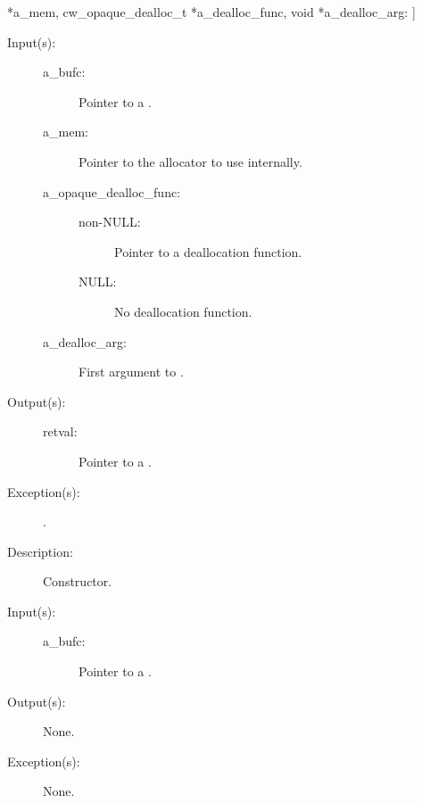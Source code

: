\begin{description}
{{*a\_mem, cw\_opaque\_dealloc\_t *a\_dealloc\_func, void *a\_dealloc\_arg}}: ]
	\begin{description}\item[]
	\item[Input(s): ]
		\begin{description}\item[]
		\item[a\_bufc: ]
			Pointer to a .
		\item[a\_mem: ]
			Pointer to the allocator to use internally.
		\item[a\_opaque\_dealloc\_func: ]
			\begin{description}\item[]
			\item[non-NULL: ] Pointer to a deallocation function.
			\item[NULL: ] No deallocation function.
			\end{description}
		\item[a\_dealloc\_arg: ]
			First argument to .
		\end{description}
	\item[Output(s): ]
		\begin{description}\item[]
		\item[retval: ]
			Pointer to a .
		\end{description}
	\item[Exception(s): ]
		\begin{description}\item[]
		\item[.]
		\end{description}
	\item[Description: ]
		Constructor.
	\end{description}
\label{bufc_delete}
\item[{\cfunc[void]{bufc\_delete}{cw\_bufc\_t *a\_bufc}}: ]
	\begin{description}\item[]
	\item[Input(s): ]
		\begin{description}\item[]
		\item[a\_bufc: ]
			Pointer to a .
		\end{description}
	\item[Output(s): ] None.
	\item[Exception(s): ] None.

\end{description}
\end{description}
